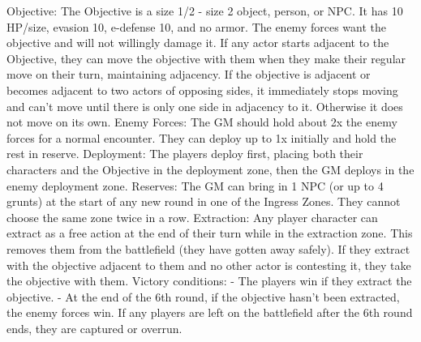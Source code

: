                                                                Objective: The Objective is a size 1/2 - size 2  
                                                               object, person, or NPC. It has 10 HP/size,  
                                                               evasion 10, e-defense 10, and no armor. The  
                                                               enemy forces want the objective and will not  
                                                               willingly damage it. If any actor starts adjacent  
                                                               to the Objective, they can move the objective  
                                                               with them when they make their regular move  
                                                               on their turn, maintaining adjacency. If the  
                                                               objective is adjacent or becomes adjacent to  
                                                               two actors of opposing sides, it immediately  
                                                               stops moving and can’t move until there is only  
                                                               one side in adjacency to it. Otherwise it does  
                                                               not move on its own.  
                                                               Enemy Forces: The GM should hold about 2x  
                                                               the enemy forces for a normal encounter. They  
                                                               can deploy up to 1x initially and hold the rest in  
                                                               reserve.  
                                                               Deployment: The players deploy first, placing  
                                                               both their characters and the Objective in the  
                                                               deployment zone, then the GM deploys in the  
enemy deployment zone.  
Reserves: The GM can bring in 1 NPC (or up to 4 grunts) at the start of any new round in one of  
the Ingress Zones. They cannot choose the same zone twice in a row.  
Extraction: Any player character can extract as a free action at the end of their turn while in the  
extraction zone. This removes them from the battlefield (they have gotten away safely). If they  
extract with the objective adjacent to them and no other actor is contesting it, they take the  
objective with them.  
Victory conditions:   
          - The players win if they extract the objective.  
          - At the end of the 6th round, if the objective hasn’t been extracted, the enemy forces win.   
          If any players are left on the battlefield after the 6th round ends, they are captured or  
         overrun.  

